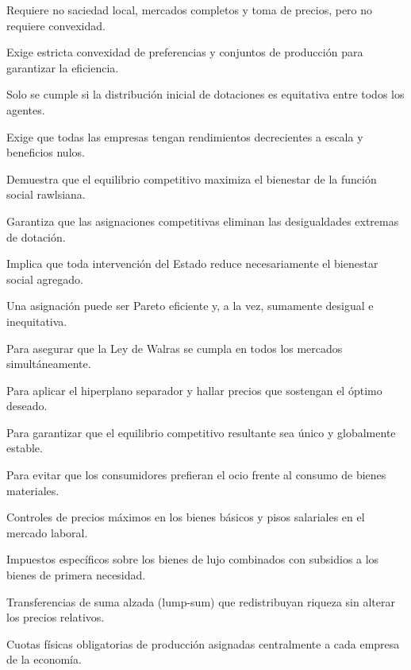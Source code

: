 \begin{opts}
    \item Requiere no saciedad local, mercados completos y toma de precios, pero no requiere convexidad.
    \item Exige estricta convexidad de preferencias y conjuntos de producción para garantizar la eficiencia.
    \item Solo se cumple si la distribución inicial de dotaciones es equitativa entre todos los agentes.
    \item Exige que todas las empresas tengan rendimientos decrecientes a escala y beneficios nulos.
\end{opts}

\begin{opts}
    \item Demuestra que el equilibrio competitivo maximiza el bienestar de la función social rawlsiana.
    \item Garantiza que las asignaciones competitivas eliminan las desigualdades extremas de dotación.
    \item Implica que toda intervención del Estado reduce necesariamente el bienestar social agregado.
    \item Una asignación puede ser Pareto eficiente y, a la vez, sumamente desigual e inequitativa.
\end{opts}

\begin{opts}
    \item Para asegurar que la Ley de Walras se cumpla en todos los mercados simultáneamente.
    \item Para aplicar el hiperplano separador y hallar precios que sostengan el óptimo deseado.
    \item Para garantizar que el equilibrio competitivo resultante sea único y globalmente estable.
    \item Para evitar que los consumidores prefieran el ocio frente al consumo de bienes materiales.
\end{opts}

\begin{opts}
    \item Controles de precios máximos en los bienes básicos y pisos salariales en el mercado laboral.
    \item Impuestos específicos sobre los bienes de lujo combinados con subsidios a los bienes de primera necesidad.
    \item Transferencias de suma alzada (lump-sum) que redistribuyan riqueza sin alterar los precios relativos.
    \item Cuotas físicas obligatorias de producción asignadas centralmente a cada empresa de la economía.
\end{opts}

